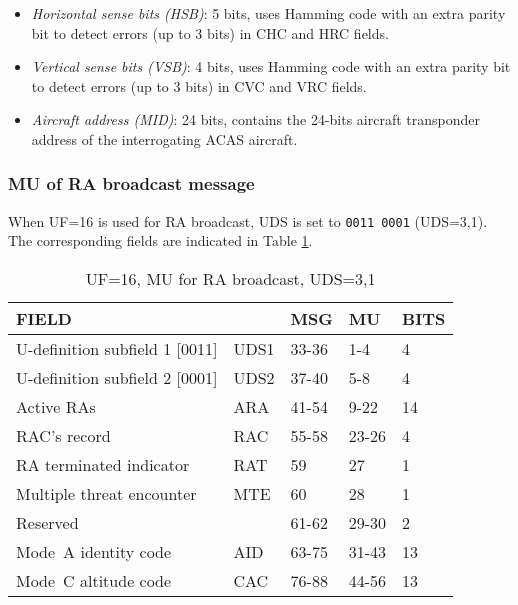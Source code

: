 \begin{itemize}
  \item \emph{Horizontal sense bits (HSB)}: 5 bits, uses Hamming code with an extra parity bit to detect errors (up to 3 bits) in CHC and HRC fields.

  \item \emph{Vertical sense bits (VSB)}: 4 bits, uses Hamming code with an extra parity bit to detect errors (up to 3 bits) in CVC and VRC fields.

  \item \emph{Aircraft address (MID)}: 24 bits, contains the 24-bits aircraft transponder address of the interrogating ACAS aircraft.

\end{itemize}



\subsubsection{MU of RA broadcast message} \label{sec:acas_ra}

When UF=16 is used for RA broadcast, UDS is set to \texttt{0011 0001} (UDS=3,1). The corresponding fields are indicated in Table \ref{tb:acas_mu_uds31}.

\begin{table}[ht]
\caption{UF=16, MU for RA broadcast, UDS=3,1}
\label{tb:acas_mu_uds31}
\begin{tabular}{|l|l|l|l|l|}
\hline
\textbf{FIELD} & \textbf{} & \textbf{MSG} & \textbf{MU} & \textbf{BITS} \\ \hline
U-definition subfield 1 [0011] & UDS1 & 33-36 & 1-4 & 4 \\ \hline
U-definition subfield 2 [0001] & UDS2 & 37-40 & 5-8 & 4 \\ \hline
Active RAs & ARA & 41-54 & 9-22 & 14 \\ \hline
RAC's record & RAC & 55-58 & 23-26 & 4 \\ \hline
RA terminated indicator & RAT & 59 & 27 & 1 \\ \hline
Multiple threat encounter & MTE & 60 & 28 & 1 \\ \hline
Reserved &  & 61-62 & 29-30 & 2 \\ \hline
Mode~A identity code & AID & 63-75 & 31-43 & 13 \\ \hline
Mode~C altitude code & CAC & 76-88 & 44-56 & 13 \\ \hline
\end{tabular}
\end{table}

